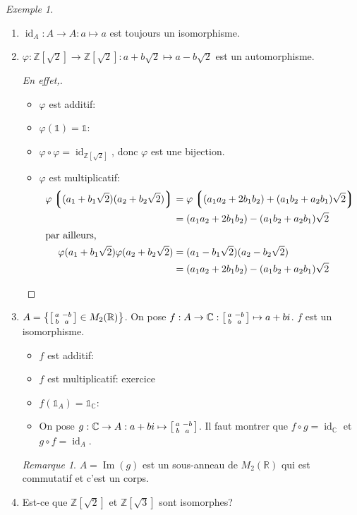 \documentclass{report}
\theoremstyle{definition}
\theoremstyle{remark}
\newtheorem*{exem}{Exemple}
\newtheorem*{rmq}{Remarque}
\def\ZZ{\mathbb{Z}}
\def\RR{\mathbb{R}}
\def\CC{\mathbb{C}}
\def\id{\mathds{1}}
\def\im{\operatorname{Im}}
\begin{document}
	\begin{exem}
		\begin{enumerate}
			\item $\operatorname{id}_A:A\to A : a\mapsto a$ est toujours un isomorphisme.
			\item $\varphi:\ZZ[\sqrt{2}]\to\ZZ[\sqrt{2}] : a+b\sqrt{2}\mapsto a-b\sqrt{2}$ est un automorphisme.
			\begin{proof}[En effet,]
				\begin{itemize}
					\item $\varphi$ est additif: \checkmark
					\item $\varphi(\id)=\id$: \checkmark
					\item $\varphi \circ \varphi = \operatorname{id}_{\ZZ[\sqrt{2}]}$, donc $\varphi$ est une bijection.
					\item $\varphi$ est multiplicatif:
					\begin{align*}
						\varphi\left\lgroup(a_1+b_1\sqrt{2})(a_2+b_2\sqrt{2})\right\rgroup&= \varphi\left\lgroup(a_1a_2+2b_1b_2) + (a_1b_2+a_2b_1)\sqrt{2}\right\rgroup\\
						&= (a_1a_2+2b_1b_2) - (a_1b_2+a_2b_1)\sqrt{2}\\
						\intertext{par ailleurs,}
						\varphi(a_1+b_1\sqrt{2})\varphi(a_2+b_2\sqrt{2})&= (a_1-b_1\sqrt{2})(a_2-b_2\sqrt{2})\\
						&= (a_1a_2+2b_1b_2) - (a_1b_2+a_2b_1)\sqrt{2}
					\end{align*}
				\end{itemize}
			\end{proof}
			\item $A=\left\{\begin{bsmallmatrix}
				a&-b\\b&a
			\end{bsmallmatrix}\in M_2(\RR)\right\}$. On pose $f:A\to \CC : \begin{bsmallmatrix}
				a&-b\\b&a
			\end{bsmallmatrix}\mapsto a+bi$. $f$ est un isomorphisme.
			\begin{itemize}
				\item $f$ est additif: \checkmark
				\item $f$ est multiplicatif: exercice
				\item $f(\id_A)=\id_\CC$: \checkmark
				\item On pose $g:\CC\to A : a+bi\mapsto\begin{bsmallmatrix}
					a&-b\\b&a
				\end{bsmallmatrix}$. Il faut montrer que $f\circ g=\operatorname{id}_\CC$ et $g\circ f=\operatorname{id}_A$.
			\end{itemize}
			\begin{rmq}
				$A=\im(g)$ est un sous-anneau de $M_2(\RR)$ qui est commutatif et c'est un corps.
			\end{rmq}
			\item Est-ce que $\ZZ[\sqrt{2}]$ et $\ZZ[\sqrt{3}]$ sont isomorphes?


\end{enumerate}
\end{exem}
\end{document}
